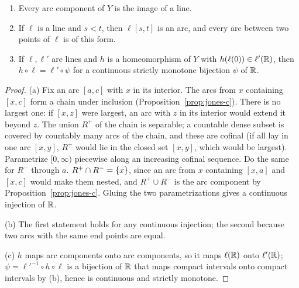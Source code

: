 
\begin{theorem}\label{thm:lines}
\leavevmode
\begin{enumerate}[label=(\alph*)]
\item Every arc component of $Y$ is the image of a line.
\item If $\ell$ is a line and $s<t$, then $\ell[s,t]$ is an arc, and every arc between two points of $\ell$ is of this form.
\item If $\ell,\ell'$ are lines and $h$ is a homeomorphism of $Y$ with $h(\ell(0))\in\ell'(\mathbb{R})$, then $h\circ\ell=\ell'\circ\psi$ for a
continuous strictly monotone bijection $\psi$ of $\mathbb{R}$.
\end{enumerate}
\end{theorem}

\begin{proof}
(a) Fix an arc $[a,c]$ with $x$ in its interior. The arcs from $x$ containing $[x,c]$ form a chain under inclusion
(Proposition~\ref{prop:jones-c}). There is no largest one: if $[x,z]$ were largest, an arc with $z$ in its interior would
extend it beyond $z$. The union $R^+$ of the chain is separable; a countable dense subset is covered by countably many
arcs of the chain, and these are cofinal (if all lay in one arc $[x,y]$, $R^+$ would lie in the closed set $[x,y]$, which
would be largest). Parametrize $[0,\infty)$ piecewise along an increasing cofinal sequence. Do the same for $R^-$ through
$a$. $R^+\cap R^-=\left\{ x \right\}$, since an arc from $x$ containing $[x,a]$ and $[x,c]$ would make them nested, and $R^+\cup R^-$ is
the arc component by Proposition~\ref{prop:jones-c}. Gluing the two parametrizations gives a continuous injection of $\mathbb{R}$.

(b) The first statement holds for any continuous injection; the second because two arcs with the same end points are
equal.

(c) $h$ maps arc components onto arc components, so it maps $\ell(\mathbb{R})$ onto $\ell'(\mathbb{R})$; $\psi=\ell'^{-1}\circ h\circ\ell$ is a bijection of $\mathbb{R}$
that maps compact intervals onto compact intervals by (b), hence is continuous and strictly monotone.
\end{proof}


